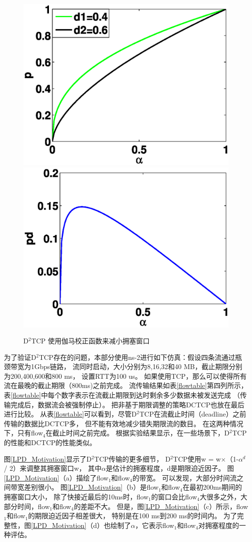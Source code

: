 \begin{figure}[h]
\centering
{}
 {\includegraphics[width=0.45\columnwidth]{figures/LPD/gamma.eps}}
{\includegraphics[width=0.45\columnwidth]{figures/LPD/PD.eps}}
\caption{D$^2$TCP 使用伽马校正函数来减小拥塞窗口}
\label{penalty-fig}
\end{figure}



为了验证D$^2$TCP存在的问题，本部分使用ns-2进行如下仿真：假设四条流通过瓶颈带宽为1Gbps链路，
流同时启动，大小分别为8,16,32和40 MB，截止期限分别为200,400,600和800 ms，
设置RTT为100 us。
如果使用TCP，那么可以使得所有流在最晚的截止期限（800ms)之前完成。
流传输结果如表\ref{flowtable}第四列所示，
表\ref{flowtable}中每个数字表示在流截止期限到达时剩余多少数据未被发送完成
（传输完成后，数据流会被强制停止）。
把非基于期限调整的策略DCTCP也放在最后进行比较。
从表\ref{flowtable}可以看到，尽管D$^2$TCP在流截止时间（deadline）之前传输的数据比DCTCP多，
但不能有效地减少错失期限流的数目。
在这两种情况下，只有flow$_4$在截止时间之前完成。
根据实验结果显示，在一些场景下，D$^2$TCP的性能和DCTCP的性能类似。 

图\ref{LPD_Motivation}显示了D$^2$TCP传输的更多细节，
D$^2$TCP使用w = w$\times$（1-$\alpha^d$/ 2）来调整其拥塞窗口w，
其中$\alpha$是估计的拥塞程度，d是期限迫近因子。
图\ref{LPD_Motivation}（a）描绘了flow$_1$和flow$_4$的带宽。
可以发现，大部分时间流之间带宽差别很小。
图\ref{LPD_Motivation}（b）是flow$_1$和flow$_4$在最初200ms期间的拥塞窗口大小，
除了快接近最后的10ms时，flow$_1$的窗口会比flow$_4$大很多之外，大部分时间，flow$_1$和flow$_4$的差距不大。
但是，图\ref{LPD_Motivation}（c）所示，flow$_1$和flow$_1$的期限迫近因子相差很大，
特别是在100 ms到200 ms的时间内。
为了完整性，图\ref{LPD_Motivation}（d）也绘制了$\alpha$，它表示flow$_1$和flow$_4$对拥塞程度的一种评估。
 
